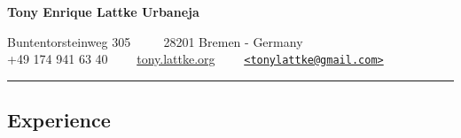 \documentclass[10pt,letterpaper]{article}
\begin{document}
\date{August, 2014}


\begin{center}
{\LARGE \textbf{Tony Enrique Lattke Urbaneja}}

Buntentorsteinweg 305  \ \ \textbullet
\ \  28201 Bremen - Germany
\\
+49 174 941 63 40 \ \ \textbullet \ \  \href{http://tony.lattke.org}{tony.lattke.org} \ \ \textbullet \ \ \href{mailto:tonylattke@gmail.com}{\nolinkurl{<tonylattke@gmail.com>}}
\end{center}


\hrule
\vspace{-0.4em}
\subsection*{Experience}
\end{document}

